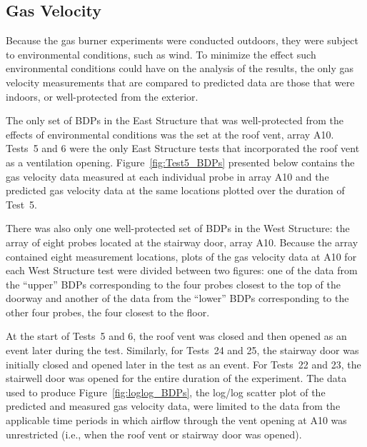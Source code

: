 \clearpage
\subsection{Gas Velocity}
Because the gas burner experiments were conducted outdoors, they were subject to environmental conditions, such as wind. To minimize the effect such environmental conditions could have on the analysis of the results, the only gas velocity measurements that are compared to predicted data are those that were indoors, or well-protected from the exterior. 

The only set of BDPs in the East Structure that was well-protected from the effects of environmental conditions was the set at the roof vent, array A10. Tests~5 and 6 were the only East Structure tests that incorporated the roof vent as a ventilation opening. Figure~\ref{fig:Test5_BDPs} presented below contains the gas velocity data measured at each individual probe in array A10 and the predicted gas velocity data at the same locations plotted over the duration of Test~5.

There was also only one well-protected set of BDPs in the West Structure: the array of eight probes located at the stairway door, array A10. Because the array contained eight measurement locations, plots of the gas velocity data at A10 for each West Structure test were divided between two figures: one of the data from the ``upper'' BDPs corresponding to the four probes closest to the top of the doorway and another of the data from the ``lower'' BDPs corresponding to the other four probes, the four closest to the floor. 

At the start of Tests~5 and 6, the roof vent was closed and then opened as an event later during the test. Similarly, for Tests~24 and 25, the stairway door was initially closed and opened later in the test as an event. For Tests~22 and 23, the stairwell door was opened for the entire duration of the experiment. The data used to produce Figure~\ref{fig:loglog_BDPs}, the log/log scatter plot of the predicted and measured gas velocity data, were limited to the data from the applicable time periods in which airflow through the vent opening at A10 was unrestricted (i.e., when the roof vent or stairway door was opened).   

